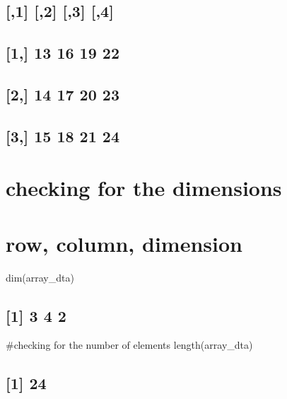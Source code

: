 \documentclass[
]{article}
\begin{document}
\hypertarget{section-8}{%
\subsection{}\label{section-8}}

\hypertarget{section-9}{%
\subsection{{[},1{]} {[},2{]} {[},3{]} {[},4{]}}\label{section-9}}

\hypertarget{section-10}{%
\subsection{{[}1,{]} 13 16 19 22}\label{section-10}}

\hypertarget{section-11}{%
\subsection{{[}2,{]} 14 17 20 23}\label{section-11}}

\hypertarget{section-12}{%
\subsection{{[}3,{]} 15 18 21 24}\label{section-12}}

\hypertarget{checking-for-the-dimensions}{%
\section{checking for the
dimensions}\label{checking-for-the-dimensions}}

\hypertarget{row-column-dimension}{%
\section{row, column, dimension}\label{row-column-dimension}}

dim(array\_dta)

\hypertarget{section-13}{%
\subsection{{[}1{]} 3 4 2}\label{section-13}}

\#checking for the number of elements length(array\_dta)

\hypertarget{section-14}{%
\subsection{{[}1{]} 24}\label{section-14}}
\end{document}
